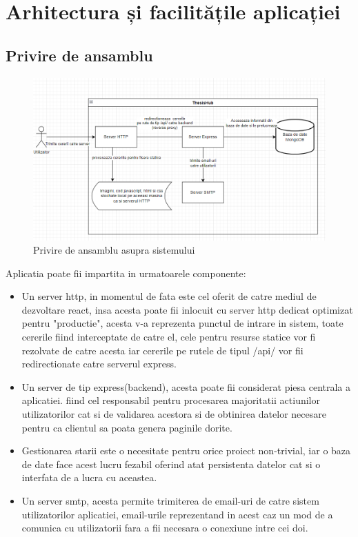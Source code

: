 \documentclass[12pt,a4paper,hidelinks]{report}
\theoremstyle{definition}
\theoremstyle{remark}
\begin{document}
\chapter{Arhitectura și facilitățile aplicației}
\section{Privire de ansamblu}
\begin{figure}[h]
    \centering
    \includegraphics[scale=0.5]{images/HighLevelOverview.PNG}
    \caption{Privire de ansamblu asupra sistemului}
\end{figure}
Aplicatia poate fii impartita in urmatoarele componente:
\begin{itemize}
    \item Un server http, in momentul de fata este cel oferit de catre mediul de dezvoltare react, insa acesta poate fii inlocuit cu server http dedicat
    optimizat pentru "productie", acesta v-a reprezenta punctul de intrare in sistem, toate cererile fiind interceptate de catre el, cele pentru resurse statice 
    vor fi rezolvate de catre acesta iar cererile pe rutele de tipul /api/ vor fii redirectionate catre serverul express.
    \item Un server de tip express(backend), acesta poate fii considerat piesa centrala a aplicatiei.
    fiind cel responsabil pentru procesarea majoritatii actiunilor utilizatorilor cat si de validarea acestora si de
    obtinirea datelor necesare pentru ca clientul sa poata genera paginile dorite.
    \item Gestionarea starii este o necesitate pentru orice proiect non-trivial, iar o baza de date face acest lucru
    fezabil oferind atat persistenta datelor cat si o interfata de a lucra cu aceastea.
    \item Un server smtp, acesta permite trimiterea de email-uri de catre sistem utilizatorilor aplicatiei, email-urile reprezentand 
     in acest caz un mod de a comunica cu utilizatorii fara a fii necesara o conexiune intre cei doi.
\end{itemize}
\end{document}
